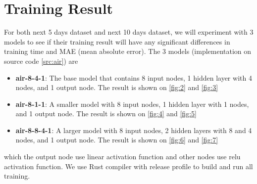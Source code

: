 \documentclass{article}
\begin{document}
\section*{Training Result}
For both next 5 days dataset and next 10 days dataset, we will experiment with 3 models to see if their training result will 
have any significant differences in training time and MAE (mean absolute error). The 3 models (implementation on source code \ref{src:air})
are 
\begin{itemize}
    \item {\textbf{air-8-4-1}: The base model that contains 8 input nodes, 1 hidden layer with 4 nodes, and 1 output node. The result 
    is shown on \cref{fig:2} and \cref{fig:3} }
    \item {\textbf{air-8-1-1}: A smaller model with 8 input nodes, 1 hidden layer with 1 nodes, and 1 output node. The result 
    is shown on \cref{fig:4} and \cref{fig:5}}
    \item {\textbf{air-8-8-4-1}: A larger model with 8 input nodes, 2 hidden layers with 8 and 4 nodes, and 1 output node. The result
    is shown on \cref{fig:6} and \cref{fig:7}}
\end{itemize} 
which the output node use linear activation function and other nodes use relu activation function. We use Rust compiler with 
release profile to build and run all training.
\end{document}
